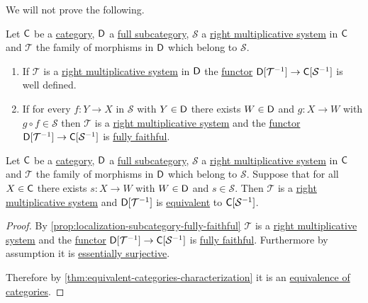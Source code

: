 \documentclass[../../main]{subfiles}
\begin{document}
We will not prove the following.
\begin{proposition}\label{prop:localization-subcategory-fully-faithful}
  Let \(\mathsf{C}\) be a \hyperref[def:category]{category}, \(\mathsf{D}\) a \hyperref[def:subcategory]{full subcategory}, \(\mathcal{S}\) a \hyperref[def:multiplicative-system]{right multiplicative system} in \(\mathsf{C}\) and \(\mathcal{T}\) the family of morphisms in \(\mathsf{D}\) which belong to \(\mathcal{S}\).
  \begin{enumerate}
    \item If \(\mathcal{T}\) is a \hyperref[def:multiplicative-system]{right multiplicative system} in \(\mathsf{D}\) the \hyperref[def:functor]{functor} \(\mathsf{D}[\mathcal{T}^{-1}] \to \mathsf{C}[\mathcal{S}^{-1}]\) is well defined.
    \item If for every \(f: Y \to X\) in \(\mathcal{S}\) with \(Y \in \mathsf{D}\) there exists \(W \in \mathsf{D}\) and \(g: X \to W\) with \(g \circ f \in \mathcal{S}\) then \(\mathcal{T}\) is a \hyperref[def:multiplicative-system]{right multiplicative system} and the \hyperref[def:functor]{functor} \(\mathsf{D}[\mathcal{T}^{-1}] \to \mathsf{C}[\mathcal{S}^{-1}]\) is \hyperref[def:functor-types]{fully faithful}.
  \end{enumerate}
\end{proposition}

\begin{corollary}\label{cor:equivalence-localization-multiplicative}
  Let \(\mathsf{C}\) be a \hyperref[def:category]{category}, \(\mathsf{D}\) a \hyperref[def:subcategory]{full subcategory}, \(\mathcal{S}\) a \hyperref[def:multiplicative-system]{right multiplicative system} in \(\mathsf{C}\) and \(\mathcal{T}\) the family of morphisms in \(\mathsf{D}\) which belong to \(\mathcal{S}\).
  Suppose that for all \(X \in \mathsf{C}\) there exists \(s: X \to W\) with \(W \in \mathsf{D}\) and \(s \in \mathcal{S}\).
  Then \(\mathcal{T}\) is a \hyperref[def:multiplicative-system]{right multiplicative system} and \(\mathsf{D}[\mathcal{T}^{-1}]\) is \hyperref[def:equivalent-categories]{equivalent} to \(\mathsf{C}[\mathcal{S}^{-1}]\).
\end{corollary}
\begin{proof}
  By \autoref{prop:localization-subcategory-fully-faithful} \(\mathcal{T}\) is a \hyperref[def:multiplicative-system]{right multiplicative system} and the \hyperref[def:functor]{functor} \(\mathsf{D}[\mathcal{T}^{-1}] \to \mathsf{C}[\mathcal{S}^{-1}]\) is \hyperref[def:functor-types]{fully faithful}.
  Furthermore by assumption it is \hyperref[def:functor-types]{essentially surjective}.

  Therefore by \autoref{thm:equivalent-categories-characterization} it is an \hyperref[def:equivalent-categories]{equivalence of categories}.
\end{proof}
\end{document}
